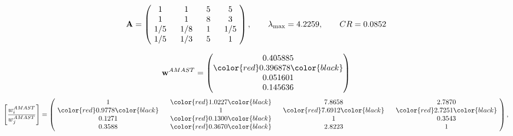 \begin{example}
\begin{equation*}
\mathbf{A} =
\begin{pmatrix}
$\,\,$ 1 $\,\,$ & $\,\,$1$\,\,$ & $\,\,$5$\,\,$ & $\,\,$5 $\,\,$ \\
$\,\,$ 1 $\,\,$ & $\,\,$ 1 $\,\,$ & $\,\,$8$\,\,$ & $\,\,$3 $\,\,$ \\
$\,\,$ 1/5$\,\,$ & $\,\,$ 1/8$\,\,$ & $\,\,$ 1 $\,\,$ & $\,\,$ 1/5 $\,\,$ \\
$\,\,$ 1/5$\,\,$ & $\,\,$ 1/3$\,\,$ & $\,\,$5$\,\,$ & $\,\,$ 1  $\,\,$ \\
\end{pmatrix},
\qquad
\lambda_{\max} =
4.2259,
\qquad
CR = 0.0852
\end{equation*}

\begin{equation*}
\mathbf{w}^{AMAST} =
\begin{pmatrix}
0.405885\\
\color{red} 0.396878\color{black} \\
0.051601\\
0.145636
\end{pmatrix}\end{equation*}
\begin{equation*}
\left[ \frac{{w}^{AMAST}_i}{{w}^{AMAST}_j} \right] =
\begin{pmatrix}
$\,\,$ 1 $\,\,$ & $\,\,$\color{red} 1.0227\color{black} $\,\,$ & $\,\,$7.8658$\,\,$ & $\,\,$2.7870$\,\,$ \\
$\,\,$\color{red} 0.9778\color{black} $\,\,$ & $\,\,$ 1 $\,\,$ & $\,\,$\color{red} 7.6912\color{black} $\,\,$ & $\,\,$\color{red} 2.7251\color{black}   $\,\,$ \\
$\,\,$0.1271$\,\,$ & $\,\,$\color{red} 0.1300\color{black} $\,\,$ & $\,\,$ 1 $\,\,$ & $\,\,$0.3543 $\,\,$ \\
$\,\,$0.3588$\,\,$ & $\,\,$\color{red} 0.3670\color{black} $\,\,$ & $\,\,$2.8223$\,\,$ & $\,\,$ 1  $\,\,$ \\
\end{pmatrix},
\end{equation*}


\end{example}
